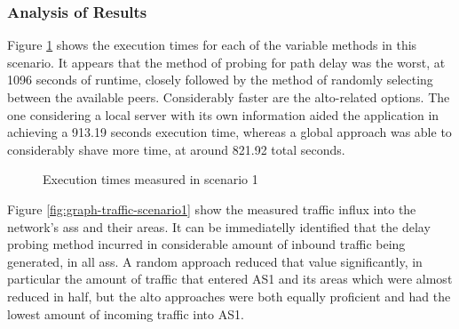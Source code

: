 \subsubsection{Analysis of Results}

Figure \ref{fig:graph-execution-scenario1} shows the execution times for each of the variable methods in this scenario.
It appears that the method of probing for path delay was the worst, at 1096 seconds of runtime, closely followed by the method of randomly selecting between the available peers.
Considerably faster are the \gls{alto}-related options.
The one considering a local server with its own information aided the application in achieving a 913.19 seconds execution time, whereas a global approach was able to considerably shave more time, at around 821.92 total seconds.

\begin{figure}[H]
\centering
{} %
\caption{Execution times measured in scenario 1}
\label{fig:graph-execution-scenario1}
\end{figure}

    Figure \ref{fig:graph-traffic-scenario1} show the measured traffic influx into the network's \glspl{as} and their areas.
    It can be immediatelly identified that the delay probing method incurred in considerable amount of inbound traffic being generated, in all \glspl{as}.
    A random approach reduced that value significantly, in particular the amount of traffic that entered AS1 and its areas which were almost reduced in half, but the \gls{alto} approaches were both equally proficient and had the lowest amount of incoming traffic into AS1.
 
